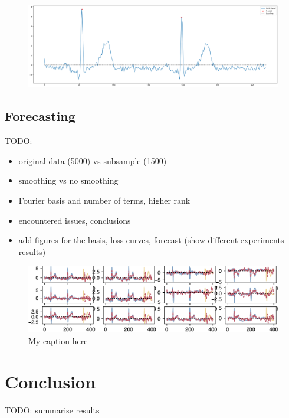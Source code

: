 \documentclass{mldsmsc}
\begin{document}
\begin{figure}[H]
\centering
\includegraphics[width=1\linewidth]{images/r_peaks.png}
\label{fig:r-peaks}
\end{figure}

\section{Forecasting}

TODO:

\begin{itemize}
    \item original data (5000) vs subsample (1500)
    \item smoothing vs no smoothing
    \item Fourier basis and number of terms, higher rank
    \item encountered issues, conclusions
    \item add figures for the basis, loss curves, forecast (show different experiments results)
\end{itemize}

\begin{figure}[H]
\begin{center}
\includegraphics[scale=1]{images/periodic_fit_1500_6_6_150it.pdf}
\caption{My caption here}
\label{somelabelforreference}
\end{center}
\end{figure}

\chapter{Conclusion}

TODO: summarise results
\end{document}
